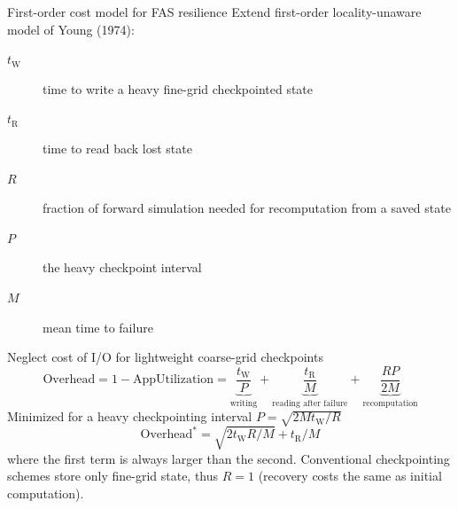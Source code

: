 \documentclass{beamer}
\newcommand{\timeR}{t_{\mathrm{R}}}
\newcommand{\timeW}{t_{\mathrm{W}}}
\begin{document}
\begin{frame}{First-order cost model for FAS resilience}
  Extend first-order locality-unaware model of Young (1974):
  \begin{description}
  \item[$\timeW$] time to write a heavy fine-grid checkpointed state
  \item[$\timeR$] time to read back lost state
  \item[$R$] fraction of forward simulation needed for recomputation from a saved state
  \item[$P$] the heavy checkpoint interval
  \item[$M$] mean time to failure
  \end{description}
  Neglect cost of I/O for lightweight coarse-grid checkpoints
  \begin{equation}\label{eq:overhead}
    \text{Overhead} = 1 - \text{AppUtilization} = \underbrace{\frac{\timeW}{P}}_{\text{writing}}
    + \underbrace{\frac{\timeR}{M}}_{\text{reading after failure}}
    + \underbrace{\frac{R P}{2M}}_{\text{recomputation}}
  \end{equation}
  Minimized for a heavy checkpointing interval $P = \sqrt{2 M \timeW / R}$
  \begin{equation}\label{eq:minoverhead}
    \text{Overhead}^* = \sqrt{2 \timeW R / M} + \timeR / M
  \end{equation}
  where the first term is always larger than the second.
  Conventional checkpointing schemes store only fine-grid state, thus $R=1$ (recovery costs the same as initial computation).
\end{frame}
\end{document}
